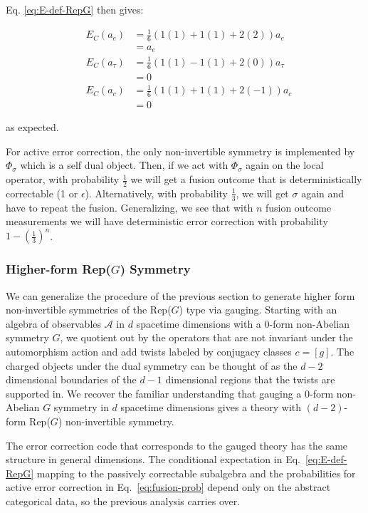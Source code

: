 \documentclass{article}
\newcommand{\mA}{\mathcal{A}}
\theoremstyle{definition}
\begin{document}
  Eq. \eqref{eq:E-def-RepG} then gives:

  \begin{eqnarray}
    &E_C(a_e) &= \frac{1}{6}(1(1) + 1(1) +2(2))a_e \\
    &&=a_e\\
    &E_C(a_\tau) &= \frac{1}{6}(1(1) - 1(1) +2(0))a_\tau \\
    &&=0\\
    &E_C(a_c) &= \frac{1}{6}(1(1) + 1(1) +2(-1))a_c \\
    &&=0
  \end{eqnarray}

  as expected.

  For active error correction, the only non-invertible symmetry is implemented
  by $\Phi_{\sigma}$ which is a self dual object. Then, if we act with
  $\Phi_{\sigma}$ again on the local operator, with probability $\frac{1}{2}$ we
  will get a fusion outcome that is deterministically correctable (1 or
  $\epsilon$). Alternatively, with probability $\frac{1}{3}$, we will get
  $\sigma$ again and have to repeat the fusion. Generalizing, we see that with
  $n$ fusion outcome measurements we will have deterministic error correction
  with probability $1-(\frac{1}{3})^{n}$.

  \subsubsection{Higher-form Rep($G$) Symmetry}

  We can generalize the procedure of the previous section to generate higher form
  non-invertible symmetries of the Rep($G$) type via gauging. Starting with an algebra
  of observables $\mA$ in $d$ spacetime dimensions with a $0$-form non-Abelian symmetry
  $G$, we quotient out by the operators that are not invariant under the
  automorphism action and add twists labeled by conjugacy classes $c = [g]$. The
  charged objects under the dual symmetry can be thought of as the $d-2$ dimensional
  boundaries of the $d-1$ dimensional regions that the twists are supported in.
  We recover the familiar understanding that gauging a $0$-form non-Abelian $G$
  symmetry in $d$ spacetime dimensions gives a theory with $(d-2)$-form Rep($G$)
  non-invertible symmetry.

  The error correction code that corresponds to the gauged theory has the same structure
  in general dimensions. The conditional expectation in Eq.~\ref{eq:E-def-RepG} mapping
  to the passively correctable subalgebra and the probabilities for active error
  correction in Eq.~\ref{eq:fusion-prob} depend only on the abstract categorical
  data, so the previous analysis carries over.
\end{document}

